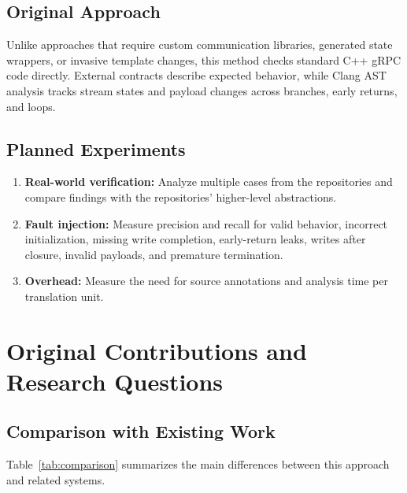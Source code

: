 \documentclass[11pt,a4paper]{article}
\begin{document}
\subsection{Original Approach}
Unlike approaches that require custom communication libraries, generated state wrappers, or invasive template changes, this method checks standard C++ gRPC code directly. External contracts describe expected behavior, while Clang AST analysis tracks stream states and payload changes across branches, early returns, and loops.

\subsection{Planned Experiments}
\begin{enumerate}
    \item \textbf{Real-world verification:} Analyze multiple cases from the repositories and compare findings with the repositories' higher-level abstractions.
    \item \textbf{Fault injection:} Measure precision and recall for valid behavior, incorrect initialization, missing write completion, early-return leaks, writes after closure, invalid payloads, and premature termination.
    \item \textbf{Overhead:} Measure the need for source annotations and analysis time per translation unit.
\end{enumerate}

\section{Original Contributions and Research Questions}

\subsection{Comparison with Existing Work}
Table~\ref{tab:comparison} summarizes the main differences between this approach and related systems.
\end{document}
